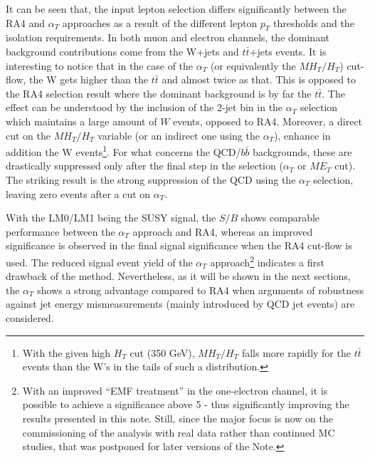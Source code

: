 It can be seen that, the input lepton selection differs significantly between the RA4 and $\alpha_{T}$ approaches as a result of the different lepton $p_{T}$ thresholds and the isolation requirements. In both muon and electron channels, the dominant background contributions come from the W+jets and $t\bar{t}$+jets events. It is interesting to notice that in the case of the $\alpha_{T}$ (or equivalently the $MH_{T}/H_{T}$) cut-flow, the W gets higher than the $t\bar{t}$ and almost twice as that. This is opposed to the RA4 selection result where the dominant background is by far the $t\bar{t}$. The effect can be understood by the inclusion of the 2-jet bin in the $\alpha_{T}$ selection which maintains a large amount of $W$ events, opposed to RA4. Moreover, a direct cut on the $MH_{T}/H_{T}$ variable (or an indirect one using the $\alpha_{T}$), enhance in addition the W events\footnote{With the given high $H_{T}$ cut (350 GeV), $MH_{T}/H_{T}$ falls more rapidly for the $t\bar{t}$ events than the W's in the tails of such a distribution.}. For what concerns the QCD/$b\bar{b}$ backgrounds, these are drastically suppressed only after the final step in the selection ($\alpha_{T}$ or $ME_{T}$ cut). The striking result is the strong suppression of the QCD using the $\alpha_{T}$ selection, leaving zero events after a cut on $\alpha_{T}$. 

With the LM0/LM1 being the SUSY signal, the $S/B$ shows comparable performance between the $\alpha_{T}$ approach and RA4, whereas an improved significance is observed in the final signal significance when the RA4 cut-flow is used. The reduced signal event yield of the $\alpha_{T}$ approach\footnote{With an improved ``EMF treatment'' in the one-electron channel, it is possible to achieve a significance above 5 - thus significantly improving the results presented in this note. Still, since the major focus is now on the commissioning of the analysis with real data rather than continued MC studies, that was postponed for later versions of the Note.} indicates a first drawback of the method. Nevertheless, as it will be shown in the next sections, the $\alpha_{T}$ shows a strong advantage compared to RA4 when arguments of robustness against jet energy mismeasurements (mainly introduced by QCD jet events) are considered.

